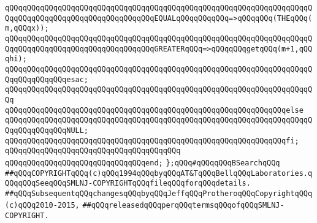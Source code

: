 \verb|qQQqqQQqqQQqqQQqqQQqqQQqqQQqqQQqqQQqqQQqqQQqqQQqqQQqqQQqqQQqqQQqqQQqqQQqqQQqqQQqqQQqqQQqqQQqqQQqqQQqqQQqEQUALqQQqqQQqqQQq=>qQQqqQQq(THEqQQq(m,qQQqx));|\newline
\verb|qQQqqQQqqQQqqQQqqQQqqQQqqQQqqQQqqQQqqQQqqQQqqQQqqQQqqQQqqQQqqQQqqQQqqQQqqQQqqQQqqQQqqQQqqQQqqQQqqQQqqQQqGREATERqQQq=>qQQqqQQqgetqQQq(m+1,qQQqhi);|\newline
\verb|qQQqqQQqqQQqqQQqqQQqqQQqqQQqqQQqqQQqqQQqqQQqqQQqqQQqqQQqqQQqqQQqqQQqqQQqqQQqqQQqqQQqesac;|\newline
\verb|qQQqqQQqqQQqqQQqqQQqqQQqqQQqqQQqqQQqqQQqqQQqqQQqqQQqqQQqqQQqqQQqqQQqqQQq|\newline
\verb|qQQqqQQqqQQqqQQqqQQqqQQqqQQqqQQqqQQqqQQqqQQqqQQqqQQqqQQqqQQqqQQqelse|\newline
\verb|qQQqqQQqqQQqqQQqqQQqqQQqqQQqqQQqqQQqqQQqqQQqqQQqqQQqqQQqqQQqqQQqqQQqqQQqqQQqqQQqqQQqNULL;|\newline
\verb|qQQqqQQqqQQqqQQqqQQqqQQqqQQqqQQqqQQqqQQqqQQqqQQqqQQqqQQqqQQqqQQqfi;|\newline
\verb|qQQqqQQqqQQqqQQqqQQqqQQqqQQqqQQqqQQqqQQq|\newline
\verb|qQQqqQQqqQQqqQQqqQQqqQQqqQQqqQQqend;|\newline
\newline
\verb|};qQQq#qQQqqQQqBSearchqQQq|\newline
\newline
\newline
\newline
\verb|##qQQqCOPYRIGHTqQQq(c)qQQq1994qQQqbyqQQqAT&TqQQqBellqQQqLaboratories.qQQqqQQqSeeqQQqSMLNJ-COPYRIGHTqQQqfileqQQqforqQQqdetails.|\newline
\verb|##qQQqSubsequentqQQqchangesqQQqbyqQQqJeffqQQqProtheroqQQqCopyrightqQQq(c)qQQq2010-2015,|\newline
\verb|##qQQqreleasedqQQqperqQQqtermsqQQqofqQQqSMLNJ-COPYRIGHT.|\newline

